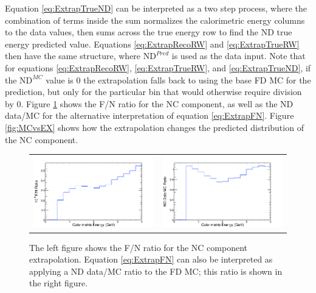 \n Equation \ref{eq:ExtrapTrueND} can be interpreted as a two step process, where the combination of terms inside the sum normalizes the calorimetric energy columns to the data values, then sums across the true energy row to find the ND true energy predicted value. Equations \ref{eq:ExtrapRecoRW} and \ref{eq:ExtrapTrueRW} then have the same structure, where $\mbox{ND}^{Pred}$ is used as the data input. Note that for equations \ref{eq:ExtrapRecoRW}, \ref{eq:ExtrapTrueRW}, and \ref{eq:ExtrapTrueND}, if the $\mbox{ND}^{MC}$ value is $0$ the extrapolation falls back to using the base FD MC for the prediction, but only for the particular bin that would otherwise require division by $0$. Figure \ref{fig:FNRatio} shows the F/N ratio for the NC component, as well as the ND data/MC for the alternative interpretation of equation \ref{eq:ExtrapFN}. Figure \ref{fig:MCvsEX} shows how the extrapolation changes the predicted distribution of the NC component.
\begin{figure}[htb]
  \centering
  \begin{tabular}{c c}
    \includegraphics[width=.47\textwidth]{figures/Extrap/FNRatio.png} &
    \includegraphics[width=.47\textwidth]{figures/Extrap/NDDatMC.png} \\
  \end{tabular}
  \caption[F/N Ratio and ND Data/MC Ratio for NC Component Extrapolation]{The left figure shows the F/N ratio for the NC component extrapolation. Equation \ref{eq:ExtrapFN} can also be interpreted as applying a ND data/MC ratio to the FD MC; this ratio is shown in the right figure.}
  \label{fig:FNRatio}
\end{figure}

